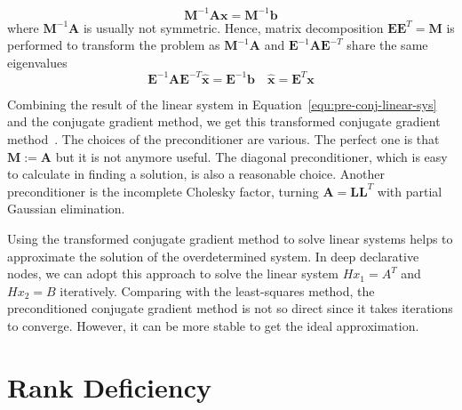 \begin{equation}
    \mathbf{M}^{-1} \mathbf{A} \mathbf{x}=\mathbf{M}^{-1} \mathbf{b}
\end{equation}
where $\mathbf{M}^{-1} \mathbf{A}$ is usually not symmetric. Hence, matrix decomposition $\mathbf{E} \mathbf{E}^{T}=\mathbf{M}$ is performed to transform the problem as $\mathbf{M}^{-1} \mathbf{A}$ and $\mathbf{E}^{-1} \mathbf{A} \mathbf{E}^{-T}$ share the same eigenvalues
\begin{equation}
    \label{equ:pre-conj-linear-sys}
    \mathbf{E}^{-1} \mathbf{A} \mathbf{E}^{-T} \hat{\mathbf{x}}=\mathbf{E}^{-1} \mathbf{b} \quad \hat{\mathbf{x}}=\mathbf{E}^{T} \mathbf{x}
\end{equation}
\par Combining the result of the linear system in Equation~\ref{equ:pre-conj-linear-sys} and the conjugate gradient method, we get this transformed conjugate gradient method~\citep{SJ:94}. The choices of the preconditioner are various. The perfect one is that $\mathbf{M} := \mathbf{A}$ but it is not anymore useful. The diagonal preconditioner, which is easy to calculate in finding a solution, is also a reasonable choice. Another preconditioner is the incomplete Cholesky factor, turning $\mathbf{A} = \mathbf{L}\mathbf{L}^T$ with partial Gaussian elimination. 
\par Using the transformed conjugate gradient method to solve linear systems helps to approximate the solution of the overdetermined system. In deep declarative nodes, we can adopt this approach to solve the linear system $Hx_1 = A^T$ and $Hx_2 = B$ iteratively. Comparing with the least-squares method, the preconditioned conjugate gradient method is not so direct since it takes iterations to converge. However, it can be more stable to get the ideal approximation. 


\section{Rank Deficiency}
\label{sec:rankdf-sol}
